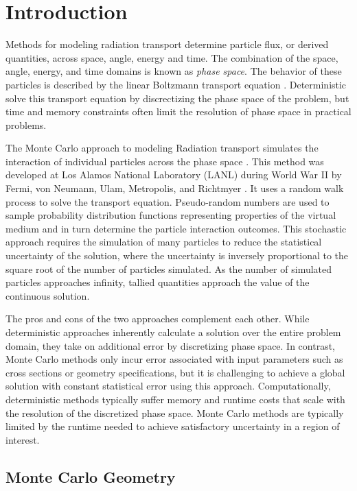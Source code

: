 
\chapter{Introduction}\label{ch:introduction}


Methods for modeling radiation transport determine particle flux, or derived
quantities, across space, angle, energy and time. The combination of the space,
angle, energy, and time domains is known as \textit{phase space}. The behavior
of these particles is described by the linear Boltzmann transport
equation \cite{Ulam_1949}. Deterministic solve this transport equation by discrectizing
the phase space of the problem, but time and memory constraints often limit the
resolution of phase space in practical problems.

The Monte Carlo approach to modeling Radiation transport simulates the
interaction of individual particles across the phase
space \cite{Lewis_1993}. This method was developed at Los Alamos National
Laboratory (LANL) during World War II by Fermi, von Neumann, Ulam, Metropolis,
and Richtmyer \cite{LANL_1987}. It uses a random walk process to solve the
transport equation. Pseudo-random numbers are used to sample probability
distribution functions representing properties of the virtual medium and in turn
determine the particle interaction outcomes. This stochastic approach requires
the simulation of many particles to reduce the statistical uncertainty of the
solution, where the uncertainty is inversely proportional to the square root of
the number of particles simulated. As the number of simulated particles
approaches infinity, tallied quantities approach the value of the continuous
solution.

The pros and cons of the two approaches complement each other. While
deterministic approaches inherently calculate a solution over the entire problem
domain, they take on additional error by discretizing phase space. In contrast,
Monte Carlo methods only incur error associated with input parameters such as
cross sections or geometry specifications, but it is challenging to achieve a
global solution with constant statistical error using this
approach. Computationally, deterministic methods typically suffer memory and
runtime costs that scale with the resolution of the discretized phase
space. Monte Carlo methods are typically limited by the runtime needed to
achieve satisfactory uncertainty in a region of interest.


\section{Monte Carlo Geometry}

